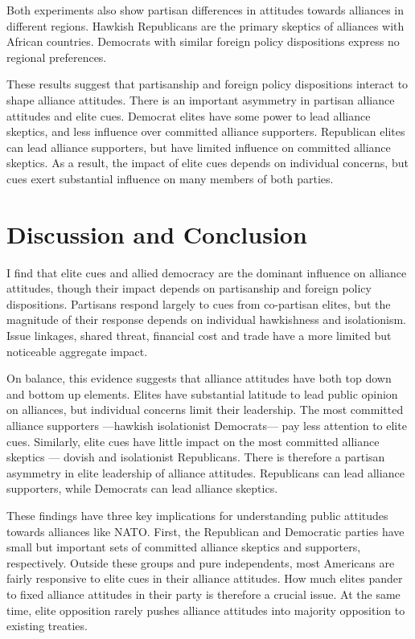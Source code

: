 \documentclass[12pt]{article}
\begin{document}
Both experiments also show partisan differences in attitudes towards alliances in different regions. 
Hawkish Republicans are the primary skeptics of alliances with African countries. 
Democrats with similar foreign policy dispositions express no regional preferences. 


These results suggest that partisanship and foreign policy dispositions interact to shape alliance attitudes. 
There is an important asymmetry in partisan alliance attitudes and elite cues. 
Democrat elites have some power to lead alliance skeptics, and less influence over committed alliance supporters. 
Republican elites can lead alliance supporters, but have limited influence on committed alliance skeptics. 
As a result, the impact of elite cues depends on individual concerns, but cues exert substantial influence on many members of both parties. 



\section{Discussion and Conclusion} 

I find that elite cues and allied democracy are the dominant influence on alliance attitudes, though their impact depends on partisanship and foreign policy dispositions. 
Partisans respond largely to cues from co-partisan elites, but the magnitude of their response depends on individual hawkishness and isolationism. 
Issue linkages, shared threat, financial cost and trade have a more limited but noticeable aggregate impact.  


On balance, this evidence suggests that alliance attitudes have both top down and bottom up elements. 
Elites have substantial latitude to lead public opinion on alliances, but individual concerns limit their leadership. 
The most committed alliance supporters ---hawkish isolationist Democrats--- pay less attention to elite cues.
Similarly, elite cues have little impact on the most committed alliance skeptics --- dovish and isolationist Republicans. 
There is therefore a partisan asymmetry in elite leadership of alliance attitudes. 
Republicans can lead alliance supporters, while Democrats can lead alliance skeptics. 


These findings have three key implications for understanding public attitudes towards alliances like NATO. 
First, the Republican and Democratic parties have small but important sets of committed alliance skeptics and supporters, respectively.
Outside these groups and pure independents, most Americans are fairly responsive to elite cues in their alliance attitudes. 
How much elites pander to fixed alliance attitudes in their party is therefore a crucial issue. 
At the same time, elite opposition rarely pushes alliance attitudes into majority opposition to existing treaties. 
\end{document}
